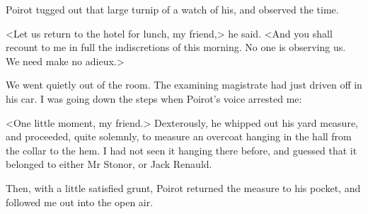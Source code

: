  Poirot tugged out that large turnip of a watch of his, and observed the time. 

 <Let us return to the hotel for lunch, my friend,> he said. <And you shall recount to me in full the indiscretions of this morning. No one is observing us. We need make no adieux.> 

 We went quietly out of the room. The examining magistrate had just driven off in his car. I was going down the steps when Poirot's voice arrested me: 

 <One little moment, my friend.> Dexterously, he whipped out his yard measure, and proceeded, quite solemnly, to measure an overcoat hanging in the hall from the collar to the hem. I had not seen it hanging there before, and guessed that it belonged to either Mr Stonor, or Jack Renauld. 

 Then, with a little satisfied grunt, Poirot returned the measure to his pocket, and followed me out into the open air.